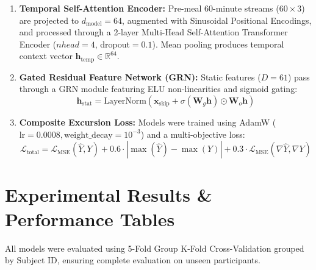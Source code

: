\documentclass[11pt,a4paper]{article}
\begin{document}
\begin{enumerate}
    \item \textbf{Temporal Self-Attention Encoder:} Pre-meal 60-minute streams ($60 \times 3$) are projected to $d_{\text{model}}=64$, augmented with Sinusoidal Positional Encodings, and processed through a 2-layer Multi-Head Self-Attention Transformer Encoder ($nhead=4$, dropout$=0.1$). Mean pooling produces temporal context vector $\mathbf{h}_{\text{temp}} \in \mathbb{R}^{64}$.
    \item \textbf{Gated Residual Feature Network (GRN):} Static features ($D=61$) pass through a GRN module featuring ELU non-linearities and sigmoid gating:
    \begin{equation}
        \mathbf{h}_{\text{stat}} = \text{LayerNorm}(\mathbf{x}_{\text{skip}} + \sigma(\mathbf{W}_g \mathbf{h}) \odot \mathbf{W}_o \mathbf{h})
    \end{equation}
    \item \textbf{Composite Excursion Loss:} Models were trained using AdamW ($\text{lr}=0.0008, \text{weight\_decay}=10^{-3}$) and a multi-objective loss:
    \begin{equation}
        \mathcal{L}_{\text{total}} = \mathcal{L}_{\text{MSE}}(\hat{Y}, Y) + 0.6 \cdot \left| \max(\hat{Y}) - \max(Y) \right| + 0.3 \cdot \mathcal{L}_{\text{MSE}}(\nabla \hat{Y}, \nabla Y)
    \end{equation}
\end{enumerate}

\section{Experimental Results \& Performance Tables}
All models were evaluated using 5-Fold Group K-Fold Cross-Validation grouped by Subject ID, ensuring complete evaluation on unseen participants.

\begin{table}[H]
\centering
\caption{Overall Continuous Trajectory Performance Metrics Across 120-Minute Horizon (Unseen Subjects)}
\label{tab:overall_results}
\end{table}
\end{document}
